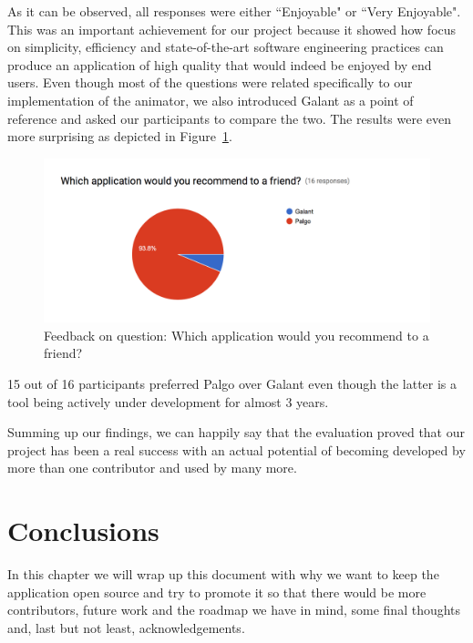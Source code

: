 \documentclass{l4proj}
\begin{document}
As it can be observed, all responses were either ``Enjoyable" or ``Very Enjoyable". This was an
important achievement for our project because it showed how focus on simplicity, efficiency and state-of-the-art
software engineering practices
can produce an application of high quality that would indeed be enjoyed by end users. Even though most of the questions
were related specifically to our implementation of the animator, we also introduced Galant as a point of reference and
asked our participants to compare the two. The results were even more surprising as depicted in Figure~\ref{fig:questionnaire-2}.

\begin{figure}[!ht]
    \centering
    \includegraphics[scale=0.6]{questionnaire-2}
    \caption{Feedback on question: Which application would you recommend to a friend?}
    \label{fig:questionnaire-2}
\end{figure}

15 out of 16 participants preferred Palgo over Galant even though the latter is a tool being actively under
development for almost 3 years.

Summing up our findings, we can happily say that the evaluation proved that our project has been a real success with an
actual potential of becoming developed by more than one contributor and used by many more.


\chapter{Conclusions}
\label{conclusions}

In this chapter we will wrap up this document with why we want to keep the application open source and try to promote it
so that there would be more contributors, future work and the roadmap we have in mind, some final thoughts and, last but
not least, acknowledgements.
\end{document}
